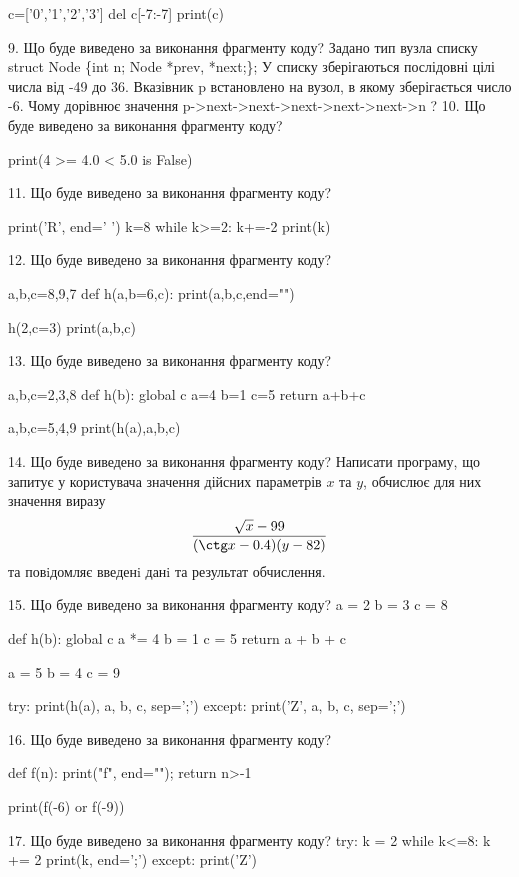 \documentclass[11pt]{article}
\begin{document}
c=['0','1','2','3']
del c[-7:-7]
print(c)


9. Що буде виведено за виконання фрагменту коду?
Задано тип вузла списку
struct Node \{int n; Node *prev, *next;\};
У списку зберігаються послідовні цілі числа від -49 до 36. Вказівник p встановлено на вузол, в якому зберігається число -6.
Чому дорівнює значення p->next->next->next->next->next->n ?
10. Що буде виведено за виконання фрагменту коду?

print(4 >= 4.0 < 5.0 is False)

11. Що буде виведено за виконання фрагменту коду?

print('R', end=' ')
k=8
while k>=2:
    k+=-2
print(k)


12. Що буде виведено за виконання фрагменту коду?

a,b,c=8,9,7
def h(a,b=6,c):
    print(a,b,c,end="")

h(2,c=3)
print(a,b,c)


13. Що буде виведено за виконання фрагменту коду?

a,b,c=2,3,8
def h(b):
global c    a=4
    b=1
    c=5
    return a+b+c

a,b,c=5,4,9
print(h(a),a,b,c)

14. Що буде виведено за виконання фрагменту коду?
Написати програму, що запитує у користувача значення дійсних параметрів $x$ та $y$, обчислює для них значення виразу 
$$\frac{\sqrt x - 99}{(\ctg x - 0.4) (y - 82)}$$ 
та повiдомляє введенi данi та результат обчислення.


15. Що буде виведено за виконання фрагменту коду?
a = 2
b = 3
c = 8

def h(b):
global c    a *= 4
    b = 1
    c = 5
    return a + b + c

a = 5
b = 4
c = 9

try:
    print(h(a), a, b, c, sep=';')
except:
    print('Z', a, b, c, sep=';')

16. Що буде виведено за виконання фрагменту коду?

def f(n):
    print("f", end="");
    return n>-1

print(f(-6) or f(-9))

17. Що буде виведено за виконання фрагменту коду?
try:
    k = 2
    while k<=8:
        k += 2
    print(k, end=';')
except:
    print('Z')
\end{document}
